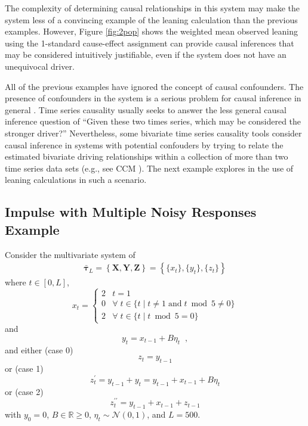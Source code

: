 \documentclass[a4paper,11pt,twocolumn]{article}
\begin{document}
The complexity of determining causal relationships in this system may make the system less of a convincing example of the leaning calculation than the previous examples.  However, Figure \ref{fig:2pop} shows the weighted mean observed leaning using the 1-standard cause-effect assignment can provide causal inferences that may be considered intuitively justifiable, even if the system does not have an unequivocal driver. 

All of the previous examples have ignored the concept of causal confounders.  The presence of confounders in the system is a serious problem for causal inference in general \cite{Rubin,Pearl}.  Time series causality usually seeks to answer the less general causal inference question of ``Given these two times series, which may be considered the stronger driver?'' Nevertheless, some bivariate time series causality tools consider causal inference in systems with potential confouders by trying to relate the estimated bivariate driving relationships within a collection of more than two time series data sets (e.g., see CCM \cite{Sugihara}).  The next example explores in the use of leaning calculations in such a scenario.

\subsection{Impulse with Multiple Noisy Responses Example}
Consider the multivariate system of
\begin{eqnarray}
\label{eqn:3var}
\bar{\mathbf{\tau}}_L = \left\{\mathbf{X},\mathbf{Y},\mathbf{Z}\right\} = \left\{\{x_t\},\{y_t\},\{z_t\}\right\}
\end{eqnarray}
where $t\in[0,L]$,
\begin{equation*}
x_t = \left\{
  \begin{array}{lr}
    2 & t = 1\\
    0 & \forall\; t\in\{t\;|\;t\neq 1 \;\mathrm{and}\; t\bmod 5 \neq 0\}\\
    2 & \forall\; t\in\{t\;|\;t\bmod 5 = 0\}
  \end{array}
\right.
\end{equation*}
and
\begin{equation*}
y_t = x_{t-1} + B\eta_t\;\;,
\end{equation*}
and either (case 0)
\begin{equation}
z_t = y_{t-1}
\end{equation}
or (case 1)
\begin{equation}
z_t^\prime = y_{t-1} + y_t = y_{t-1} + x_{t-1} + B\eta_t
\end{equation}
or (case 2)
\begin{equation}
z_t^{\prime\prime} = y_{t-1} + x_{t-1} + z_{t-1}
\end{equation}
with $y_0 = 0$, $B\in\mathbb{R}\ge 0$, $\eta_t\sim\mathcal{N}\left(0,1\right)$, and $L=500$.
\end{document}
